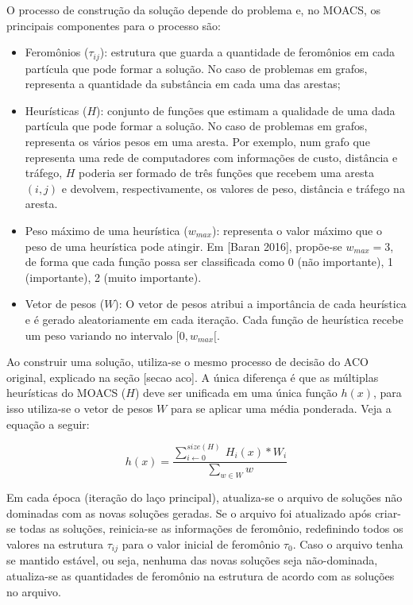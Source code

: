 O processo de construção da solução depende do problema e, no MOACS, os principais componentes para o processo são:

\begin{itemize}  
	\item Feromônios ($\tau_{ij}$): estrutura que guarda a quantidade de feromônios em cada partícula que pode formar a solução. No caso de problemas em grafos, representa a quantidade da substância em cada uma das arestas;
	\item Heurísticas ($H$): conjunto de funções que estimam a qualidade de uma dada partícula que pode formar a solução. No caso de problemas em grafos, representa os vários pesos em uma aresta. Por exemplo, num grafo que representa uma rede de computadores com informações de custo, distância e tráfego, $H$ poderia ser formado de três funções que recebem uma aresta $(i,j)$ e devolvem, respectivamente, os valores de peso, distância e tráfego na aresta.
	\item Peso máximo de uma heurística ($w_{max}$): representa o valor máximo que o peso de uma heurística pode atingir. Em [Baran 2016], propõe-se $w_{max} = 3$, de forma que cada função possa ser classificada como 0 (não importante), 1 (importante), 2 (muito importante).
	\item Vetor de pesos ($W$): O vetor de pesos atribui a importância de cada heurística e é gerado aleatoriamente em cada iteração. Cada função de heurística recebe um peso variando no intervalo $[0, w_{max}[$.
\end{itemize}

Ao construir uma solução, utiliza-se o mesmo processo de decisão do ACO original, explicado na seção [secao aco]. A única diferença é que as múltiplas heurísticas do MOACS ($H$) deve ser unificada em uma única função $h(x)$, para isso utiliza-se o vetor de pesos $W$ para se aplicar uma média ponderada. Veja a equação a seguir:

\[h(x) = \frac{\sum_{i \gets 0}^{size(H)}\ H_i(x) * W_i}{\sum_{w \in W} w}\]

Em cada época (iteração do laço principal), atualiza-se o arquivo de soluções não dominadas com as novas soluções geradas. Se o arquivo foi atualizado após criar-se todas as soluções, reinicia-se as informações de feromônio, redefinindo todos os valores na estrutura $\tau_{ij}$ para o valor inicial de feromônio $\tau_0$. Caso o arquivo tenha se mantido estável, ou seja, nenhuma das novas soluções seja não-dominada, atualiza-se as quantidades de feromônio na estrutura de acordo com as soluções no arquivo.


